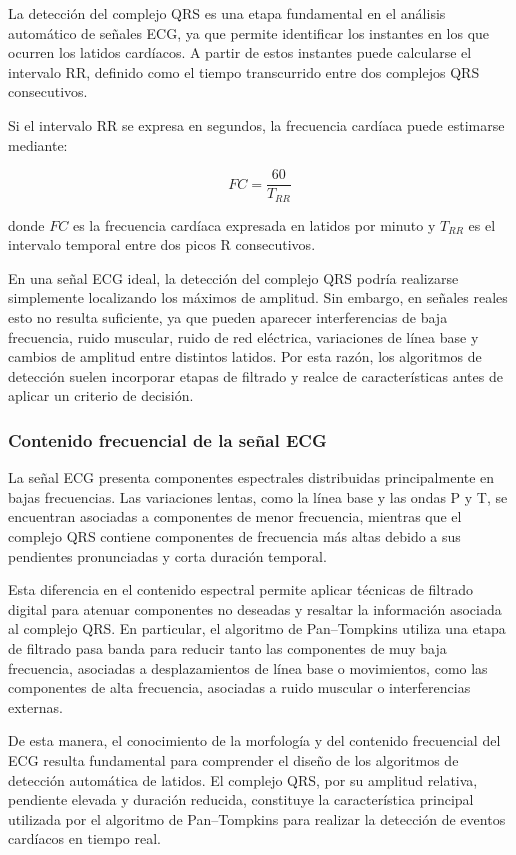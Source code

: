 \documentclass[12pt]{article}
\begin{document}
				La detección del complejo QRS es una etapa fundamental en el análisis automático de señales ECG, ya que permite identificar los instantes en los que ocurren los latidos cardíacos. A partir de estos instantes puede calcularse el intervalo RR, definido como el tiempo transcurrido entre dos complejos QRS consecutivos.

				Si el intervalo RR se expresa en segundos, la frecuencia cardíaca puede estimarse mediante:

				\begin{equation}
					FC = \frac{60}{T_{RR}}
				\end{equation}

				donde $FC$ es la frecuencia cardíaca expresada en latidos por minuto y $T_{RR}$ es el intervalo temporal entre dos picos R consecutivos.

				En una señal ECG ideal, la detección del complejo QRS podría realizarse simplemente localizando los máximos de amplitud. Sin embargo, en señales reales esto no resulta suficiente, ya que pueden aparecer interferencias de baja frecuencia, ruido muscular, ruido de red eléctrica, variaciones de línea base y cambios de amplitud entre distintos latidos. Por esta razón, los algoritmos de detección suelen incorporar etapas de filtrado y realce de características antes de aplicar un criterio de decisión.

				\subsubsection{Contenido frecuencial de la señal ECG}

				La señal ECG presenta componentes espectrales distribuidas principalmente en bajas frecuencias. Las variaciones lentas, como la línea base y las ondas P y T, se encuentran asociadas a componentes de menor frecuencia, mientras que el complejo QRS contiene componentes de frecuencia más altas debido a sus pendientes pronunciadas y corta duración temporal.

				Esta diferencia en el contenido espectral permite aplicar técnicas de filtrado digital para atenuar componentes no deseadas y resaltar la información asociada al complejo QRS. En particular, el algoritmo de Pan--Tompkins utiliza una etapa de filtrado pasa banda para reducir tanto las componentes de muy baja frecuencia, asociadas a desplazamientos de línea base o movimientos, como las componentes de alta frecuencia, asociadas a ruido muscular o interferencias externas.

				De esta manera, el conocimiento de la morfología y del contenido frecuencial del ECG resulta fundamental para comprender el diseño de los algoritmos de detección automática de latidos. El complejo QRS, por su amplitud relativa, pendiente elevada y duración reducida, constituye la característica principal utilizada por el algoritmo de Pan--Tompkins para realizar la detección de eventos cardíacos en tiempo real.
\end{document}
